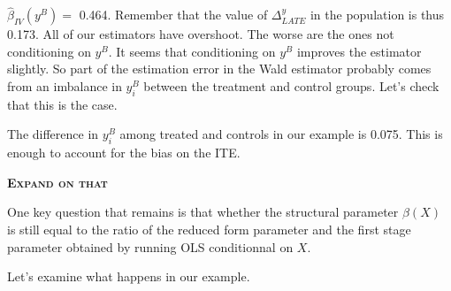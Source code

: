 \documentclass[]{book}
\newenvironment{Shaded}{\begin{snugshade}}{\end{snugshade}}
\newcommand{\KeywordTok}[1]{\textcolor[rgb]{0.13,0.29,0.53}{\textbf{#1}}}
\newcommand{\DecValTok}[1]{\textcolor[rgb]{0.00,0.00,0.81}{#1}}
\newcommand{\StringTok}[1]{\textcolor[rgb]{0.31,0.60,0.02}{#1}}
\newcommand{\OperatorTok}[1]{\textcolor[rgb]{0.81,0.36,0.00}{\textbf{#1}}}
\newcommand{\NormalTok}[1]{#1}
\theoremstyle{definition}
\theoremstyle{definition}
\theoremstyle{definition}
\theoremstyle{remark}
\let\BeginKnitrBlock\begin \let\EndKnitrBlock\end
\begin{document}
\begin{Shaded}
\end{Shaded}

\(\hat{\beta}_{IV}(y^B)=\) 0.464. Remember that the value of
\(\Delta^y_{LATE}\) in the population is thus 0.173. All of our
estimators have overshoot. The worse are the ones not conditioning on
\(y^B\). It seems that conditioning on \(y^B\) improves the estimator
slightly. So part of the estimation error in the Wald estimator probably
comes from an imbalance in \(y_i^B\) between the treatment and control
groups. Let's check that this is the case.

\begin{Shaded}
\end{Shaded}

The difference in \(y_i^B\) among treated and controls in our example is
0.075. This is enough to account for the bias on the ITE.

\textbf{\textsc{Expand on that}}

\BeginKnitrBlock{remark}
\iffalse{} {Remark. } \fi{}One key question that remains is that whether
the structural parameter \(\beta(X)\) is still equal to the ratio of the
reduced form parameter and the first stage parameter obtained by running
OLS conditionnal on \(X\).
\EndKnitrBlock{remark}

\BeginKnitrBlock{example}
\protect\hypertarget{exm:unnamed-chunk-127}{}{\label{exm:unnamed-chunk-127}
}Let's examine what happens in our example.
\EndKnitrBlock{example}
\end{document}
